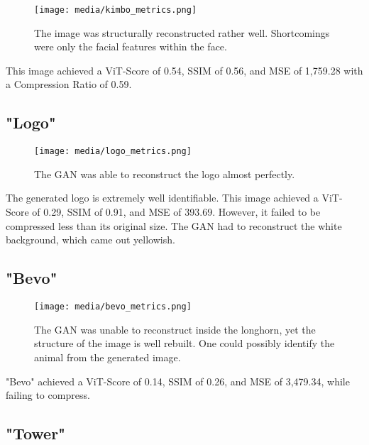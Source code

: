 \begin{figure}[H]
	\begin{center}
	\texttt{[image: media/kimbo\_metrics.png]}
	\end{center}
	\caption["Kliment" Established Metrics]{The image was structurally reconstructed rather well.
    Shortcomings were only the facial features within the face.}
	\end{figure}


This image achieved a ViT-Score of 0.54, SSIM of 0.56, and MSE of 1,759.28 with a Compression Ratio of 0.59.

\subsection{"Logo"}

\begin{figure}[H]
	\begin{center}
	\texttt{[image: media/logo\_metrics.png]}
	\end{center}
	\caption["Logo" Established Metrics]{The GAN was able to reconstruct the logo almost perfectly.}
	\end{figure}


    The generated logo is extremely well identifiable.
    This image achieved a ViT-Score of 0.29, SSIM of 0.91, and MSE of 393.69. However, it failed to be compressed
    less than its original size. The GAN had to reconstruct the white background, which came out yellowish.

\subsection{"Bevo"}

\begin{figure}[H]
        \begin{center}
        \texttt{[image: media/bevo\_metrics.png]}
        \end{center}
        \caption["Bevo" Established Metrics]{The GAN was unable to reconstruct inside the longhorn, yet
        the structure of the image is well rebuilt. One could possibly identify the animal from the generated image.}
        \end{figure}

"Bevo" achieved a ViT-Score of 0.14, SSIM of 0.26, and MSE of 3,479.34, while failing to compress. 

\subsection{"Tower"}

